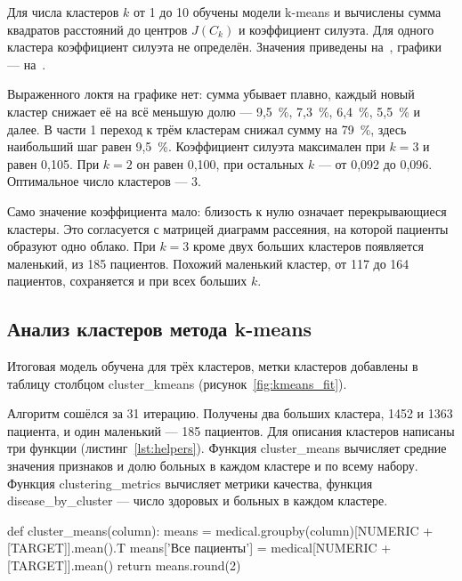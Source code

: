 \documentclass[a4paper,14pt]{extarticle}
\begin{document}
Для числа кластеров $k$ от 1 до 10 обучены модели k-means и вычислены сумма квадратов расстояний до центров $J(C_k)$ и коэффициент силуэта. Для одного кластера коэффициент силуэта не определён. Значения приведены на~, графики — на~.



Выраженного локтя на графике нет: сумма убывает плавно, каждый новый кластер снижает её на всё меньшую долю — 9,5~\%, 7,3~\%, 6,4~\%, 5,5~\% и далее. В части 1 переход к трём кластерам снижал сумму на 79~\%, здесь наибольший шаг равен 9,5~\%. Коэффициент силуэта максимален при $k = 3$ и равен 0,105. При $k = 2$ он равен 0,100, при остальных $k$ — от 0,092 до 0,096. Оптимальное число кластеров — 3.

Само значение коэффициента мало: близость к нулю означает перекрывающиеся кластеры. Это согласуется с матрицей диаграмм рассеяния, на которой пациенты образуют одно облако. При $k = 3$ кроме двух больших кластеров появляется маленький, из 185 пациентов. Похожий маленький кластер, от 117 до 164 пациентов, сохраняется и при всех больших $k$.

\subsection{Анализ кластеров метода k-means}

Итоговая модель обучена для трёх кластеров, метки кластеров добавлены в таблицу столбцом cluster\_kmeans (рисунок~\ref{fig:kmeans_fit}).


Алгоритм сошёлся за 31 итерацию. Получены два больших кластера, 1452 и 1363 пациента, и один маленький — 185 пациентов. Для описания кластеров написаны три функции (листинг~\ref{lst:helpers}). Функция cluster\_means вычисляет средние значения признаков и долю больных в каждом кластере и по всему набору. Функция clustering\_metrics вычисляет метрики качества, функция disease\_by\_cluster — число здоровых и больных в каждом кластере.

    def cluster_means(column):
        means = medical.groupby(column)[NUMERIC + [TARGET]].mean().T
        means['Все пациенты'] = medical[NUMERIC + [TARGET]].mean()
        return means.round(2)
\end{document}
